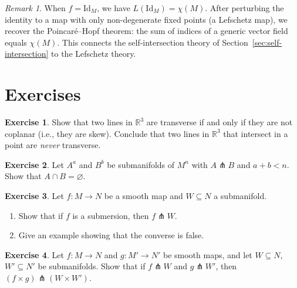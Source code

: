 \documentclass[12pt,a4paper,openany]{book}
\theoremstyle{definition}
\newtheorem{exercise}{Exercise}[chapter]
\theoremstyle{remark}
\newtheorem{remark}[theorem]{Remark}
\newcommand{\R}{\mathbb{R}}
\newcommand{\Id}{\mathrm{Id}}
\begin{document}
\begin{remark}\label{rem:lefschetz-euler}
When $f = \Id_M$, we have $L(\Id_M) = \chi(M)$. After perturbing the
identity to a map with only non-degenerate fixed points (a Lefschetz
map), we recover the Poincar\'e--Hopf theorem: the sum of indices of
a generic vector field equals $\chi(M)$. This connects the self-intersection
theory of Section~\ref{sec:self-intersection} to the Lefschetz theory.
\end{remark}

\section{Exercises}\label{sec:exercises-transversality}

\begin{exercise}\label{exo:transverse-basic}
Show that two lines in $\R^3$ are transverse if and only if they are not
coplanar (i.e., they are skew). Conclude that two lines in $\R^3$ that
intersect in a point are \emph{never} transverse.
\end{exercise}

\begin{exercise}\label{exo:transverse-codimension}
Let $A^a$ and $B^b$ be submanifolds of $M^n$ with $A \pitchfork B$ and
$a + b < n$. Show that $A \cap B = \varnothing$.
\end{exercise}

\begin{exercise}\label{exo:submersion-transverse}
Let $f \colon M \to N$ be a smooth map and $W \subseteq N$ a submanifold.
\begin{enumerate}[label=(\alph*)]
  \item Show that if $f$ is a submersion, then $f \pitchfork W$.
  \item Give an example showing that the converse is false.
\end{enumerate}
\end{exercise}

\begin{exercise}\label{exo:transverse-product}
Let $f \colon M \to N$ and $g \colon M' \to N'$ be smooth maps, and let
$W \subseteq N$, $W' \subseteq N'$ be submanifolds. Show that if
$f \pitchfork W$ and $g \pitchfork W'$, then
$(f \times g) \pitchfork (W \times W')$.
\end{exercise}
\end{document}
